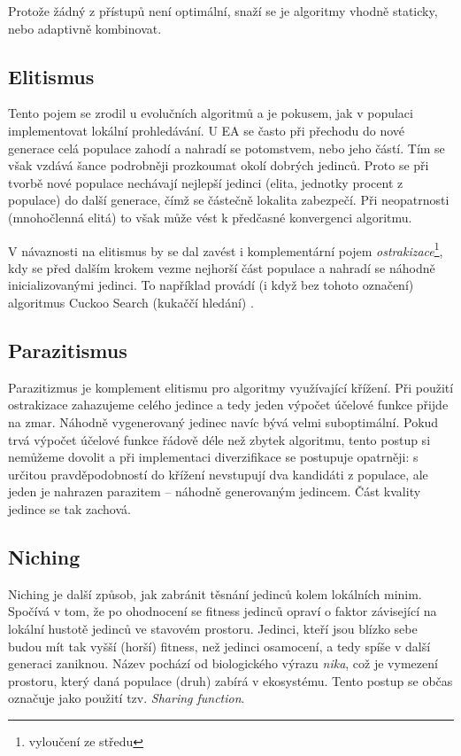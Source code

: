 Protože žádný z přístupů není optimální, snaží se je algoritmy vhodně staticky, nebo adaptivně kombinovat.

\subsection{Elitismus}

Tento pojem se zrodil u evolučních algoritmů a je pokusem, jak v populaci implementovat lokální prohledávání. U EA se často při přechodu do nové generace celá populace zahodí a nahradí se potomstvem, nebo jeho částí. Tím se však vzdává šance podrobněji prozkoumat okolí dobrých jedinců. Proto se při tvorbě nové populace nechávají nejlepší jedinci (elita, jednotky procent z populace) do další generace, čímž se částečně lokalita zabezpečí. Při neopatrnosti (mnohočlenná elitá) to však může vést k předčasné konvergenci algoritmu.

V návaznosti na elitismus by se dal zavést i komplementární pojem \emph{ostrakizace}\footnote{vyloučení ze středu}, kdy se před dalším krokem vezme nejhorší část populace a nahradí se náhodně inicializovanými jedinci. To například provádí (i když bez tohoto označení) algoritmus Cuckoo Search (kukaččí hledání) \cite{cuckoo}.

\subsection{Parazitismus}

Parazitizmus je komplement elitismu pro algoritmy využívající křížení. Při použití ostrakizace zahazujeme celého jedince a tedy jeden výpočet účelové funkce přijde na zmar. Náhodně vygenerovaný jedinec navíc bývá velmi suboptimální. Pokud trvá výpočet účelové funkce řádově déle než zbytek algoritmu, tento postup si nemůžeme dovolit a při implementaci diverzifikace se postupuje opatrněji: s určitou pravděpodobností do křížení nevstupují dva kandidáti z populace, ale jeden je nahrazen parazitem -- náhodně generovaným jedincem. Část kvality jedince se tak zachová.

\subsection{Niching}

Niching je další způsob, jak zabránit těsnání jedinců kolem lokálních minim. Spočívá v tom, že po ohodnocení se fitness jedinců opraví o faktor závisející na lokální hustotě jedinců ve stavovém prostoru. Jedinci, kteří jsou blízko sebe budou mít tak vyšší (horší) fitness, než jedinci osamocení, a tedy spíše v další generaci zaniknou. Název pochází od biologického výrazu \emph{nika}, což je vymezení prostoru, který daná populace (druh) zabírá v ekosystému. Tento postup se občas označuje jako použití tzv. \emph{Sharing function}.

